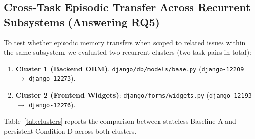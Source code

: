 \documentclass[conference]{IEEEtran}
\begin{document}
\subsection{Cross-Task Episodic Transfer Across Recurrent Subsystems (Answering RQ5)}
\label{sec:clusters}
To test whether episodic memory transfers when scoped to related issues within the same subsystem, we evaluated two recurrent clusters (two task pairs in total):
\begin{enumerate}
    \item \textbf{Cluster 1 (Backend ORM)}: \texttt{django/db/models/base.py} (\texttt{django-12209} $\to$ \texttt{django-12273}).
    \item \textbf{Cluster 2 (Frontend Widgets)}: \texttt{django/forms/widgets.py} (\texttt{django-12193} $\to$ \texttt{django-12276}).
\end{enumerate}

Table~\ref{tab:clusters} reports the comparison between stateless Baseline A and persistent Condition D across both clusters.

\begin{table}[!t]
\caption{Cross-Subsystem Recurrent Cluster Evaluation}
\label{tab:clusters}
\centering
\setlength{\tabcolsep}{2.5pt}
\end{table}
\end{document}
